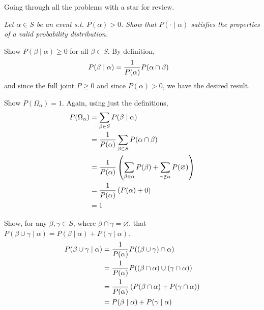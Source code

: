 \documentclass[11pt]{article}
\begin{document}

Going through all the problems with a star for review. \\

\begin{example}[Exercise 2.4]
	\textit{Let $\alpha \in S$ be an event s.t. $P(\alpha) > 0$. Show that $P(\cdot \mid \alpha)$ satisfies the properties of a valid probability distribution.} 
	\tcblower 
\begin{compactitem}
	\item Show $P(\beta \mid \alpha) \ge 0$ for all $\beta \in S$.  By definition,
	\begin{align}
		P(\beta \mid \alpha) &= \frac{1}{P(\alpha)} P(\alpha \cap \beta) 
	\end{align}
	and since the full joint $P \ge 0$ and since $P(\alpha) > 0$, we have the desired result. 
	
	\item Show $P(\Omega_\alpha) = 1$. Again, using just the definitions,
	\begin{align}
		P(\Omega_{\alpha}) &= \sum_{\beta \in S} P(\beta \mid \alpha) \\
		&= \frac{1}{P(\alpha)} \sum_{\beta \in S} P(\alpha \cap \beta) \\
		&= \frac{1}{P(\alpha)} \left( \sum_{\beta \in \alpha} P(\beta) + \sum_{\gamma \notin \alpha} P(\varnothing)  \right) \\
		&= \frac{1}{P(\alpha)} \left( P(\alpha) + 0 \right) \\
		&= 1
	\end{align}
	
	\item Show, for any $\beta, \gamma \in S$, where $\beta \cap \gamma = \varnothing$, that $P(\beta \cup \gamma \mid \alpha) = P(\beta \mid \alpha) + P(\gamma \mid \alpha)$. 
	\begin{align}
		P(\beta \cup \gamma \mid \alpha) 
		&= \frac{1}{P(\alpha)} P( (\beta \cup \gamma) \cap \alpha   ) \\
		&= \frac{1}{P(\alpha)} P( (\beta \cap \alpha) \cup (\gamma \cap \alpha) ) \\
		&= \frac{1}{P(\alpha)} \left( P(\beta \cap \alpha) + P(\gamma \cap \alpha)  \right) \\
		&= P(\beta \mid \alpha) + P(\gamma \mid \alpha)
	\end{align}
\end{compactitem}
\end{example}
\end{document}
